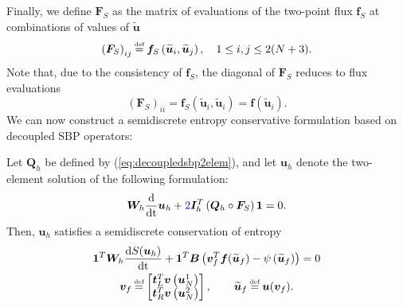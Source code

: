 \documentclass[review,onefignum,onetabnum,final]{siamart171218}
\renewcommand{\tilde}{\widetilde}
\newcommand{\td}[2]{\frac{{\rm d}#1}{{\rm d}{\rm #2}}}
\newcommand{\LRp}[1]{\left( #1 \right)}
\newcommand{\note}[1]{{\color{blue}{#1}}}
\newcommand\myeq{\mathrel{\stackrel{\makebox[0pt]{\mbox{\normalfont\tiny def}}}{=}}}
\begin{document}
Finally, we define $\bm{F}_S$ as the matrix of evaluations of the two-point flux $\bm{f}_S$ at combinations of values of $\tilde{\bm{u}}$
\[
\LRp{\bm{F}_S}_{ij} \myeq \bm{f}_S\LRp{\tilde{\bm{u}}_i,\tilde{\bm{u}}_j}, \quad 1\leq i,j \leq 2(N+3).
\]
Note that, due to the consistency of $\bm{f}_S$, the diagonal of $\bm{F}_S$ reduces to flux evaluations
\begin{equation}
\label{eq:diagFS}
\LRp{\bm{F}_S}_{ii} = \bm{f}_S\LRp{\tilde{\bm{u}}_i,\tilde{\bm{u}}_i} = \bm{f}\LRp{\tilde{\bm{u}}_i}.  
\end{equation}
We can now construct a semidiscrete entropy conservative formulation based on decoupled SBP operators:
\begin{theorem}
\label{thm:consentropy}
Let $\bm{Q}_h$ be defined by (\ref{eq:decoupledsbp2elem}), and let $\bm{u}_h$ denote the two-element solution of the following formulation:
\begin{gather}
\label{eq:form}
\bm{W}_h \td{}{t} \bm{u}_h + \note{2} \bm{I}_h^T\LRp{\bm{Q}_h \circ \bm{F}_S}\bm{1} = 0.
\end{gather}
Then, $\bm{u}_h$ satisfies a semidiscrete conservation of entropy
\begin{gather*}
\bm{1}^T\bm{W}_h\td{S(\bm{u}_h)}{t} + \bm{1}^T\bm{B}\LRp{\bm{v}_f^T\bm{f}(\tilde{\bm{u}}_f) - \psi\LRp{\tilde{\bm{u}}_f}} = 0\\
\bm{v}_f \myeq \begin{bmatrix}
\bm{t}_L^T \bm{v}\LRp{\bm{u}_N^1}\\
\bm{t}_R^T \bm{v}\LRp{\bm{u}_N^2}
\end{bmatrix}, \qquad \tilde{\bm{u}}_f \myeq \bm{u}(\bm{v}_f).
\end{gather*}
\end{theorem}
\end{document}

